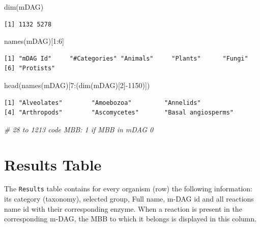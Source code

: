 \documentclass[
  letterpaper,
  DIV=11,
  numbers=noendperiod]{scrreprt}
\newenvironment{Shaded}{}{}
\newcommand{\CommentTok}[1]{\textcolor[rgb]{0.36,0.39,0.44}{\textit{#1}}}
\newcommand{\DecValTok}[1]{\textcolor[rgb]{0.82,0.60,0.40}{#1}}
\newcommand{\FunctionTok}[1]{\textcolor[rgb]{0.38,0.69,0.94}{#1}}
\newcommand{\NormalTok}[1]{\textcolor[rgb]{0.67,0.70,0.75}{#1}}
\newcommand{\SpecialCharTok}[1]{\textcolor[rgb]{0.34,0.71,0.76}{#1}}
\begin{document}
\begin{Shaded}
\begin{Highlighting}[]
\FunctionTok{dim}\NormalTok{(mDAG)}
\end{Highlighting}
\end{Shaded}

\begin{verbatim}
[1] 1132 5278
\end{verbatim}

\begin{Shaded}
\begin{Highlighting}[]
\FunctionTok{names}\NormalTok{(mDAG)[}\DecValTok{1}\SpecialCharTok{:}\DecValTok{6}\NormalTok{]}
\end{Highlighting}
\end{Shaded}

\begin{verbatim}
[1] "mDAG Id"     "#Categories" "Animals"     "Plants"      "Fungi"      
[6] "Protists"   
\end{verbatim}

\begin{Shaded}
\begin{Highlighting}[]
\FunctionTok{head}\NormalTok{(}\FunctionTok{names}\NormalTok{(mDAG)[}\DecValTok{7}\SpecialCharTok{:}\NormalTok{(}\FunctionTok{dim}\NormalTok{(mDAG)[}\DecValTok{2}\NormalTok{]}\SpecialCharTok{{-}}\DecValTok{1150}\NormalTok{)])}
\end{Highlighting}
\end{Shaded}

\begin{verbatim}
[1] "Alveolates"        "Amoebozoa"         "Annelids"         
[4] "Arthropods"        "Ascomycetes"       "Basal angiosperms"
\end{verbatim}

\begin{Shaded}
\begin{Highlighting}[]
\CommentTok{\# 28 to 1213  code MBB: 1 if MBB in mDAG 0}
\end{Highlighting}
\end{Shaded}

\hypertarget{results-table}{%
\section{Results Table}\label{results-table}}

The \texttt{Results} table contains for every organism (row) the
following information: its category (taxonomy), selected group, Full
name, m-DAG id and all reactions name id with their corresponding
enzyme. When a reaction is present in the corresponding m-DAG, the MBB
to which it belongs is displayed in this column.
\end{document}
